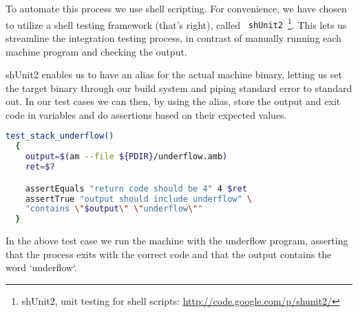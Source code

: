 To automate this process we use shell scripting. For convenience, we have chosen
to utilize a shell testing framework (that's right), called {\tt
  shUnit2}~\footnote{shUnit2, unit testing for shell scripts:
  \url{http://code.google.com/p/shunit2/}}. This lets us streamline the
integration testing process, in contrast of manually running each machine
program and checking the output.

shUnit2 enables us to have an alias for the actual machine binary, letting us
set the target binary through our build system and piping standard error to
standard out. In our test cases we can then, by using the alias, store the
output and exit code in variables and do assertions based on their expected
values.
\begin{lstlisting}[language={sh},caption={shUnit2 underflow test case}]
  test_stack_underflow()
  {
    output=$(am --file ${PDIR}/underflow.amb)
    ret=$?

    assertEquals "return code should be 4" 4 $ret
    assertTrue "output should include underflow" \
    "contains \"$output\" \"underflow\""
  }
\end{lstlisting}

In the above test case we run the machine with the underflow program, asserting
that the process exits with the correct code and that the output contains the
word `underflow`.

